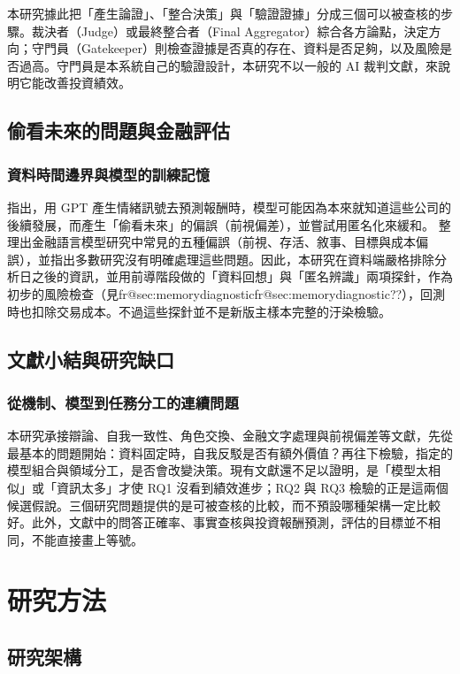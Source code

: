 \documentclass[12pt,a4paper]{article}
\makeatletter
\numberwithin{table}{section}
\numberwithin{figure}{section}
\newcommand{\frref}[1]{\ifcsname fr@#1\endcsname\csname fr@#1\endcsname\else ??\fi}
\makeatother
\begin{document}
本研究據此把「產生論證」、「整合決策」與「驗證證據」分成三個可以被查核的步驟。裁決者（Judge）或最終整合者（Final Aggregator）綜合各方論點，決定方向；守門員（Gatekeeper）則檢查證據是否真的存在、資料是否足夠，以及風險是否過高。守門員是本系統自己的驗證設計，本研究不以一般的 AI 裁判文獻，來說明它能改善投資績效。

\subsection{偷看未來的問題與金融評估}

\subsubsection{資料時間邊界與模型的訓練記憶}
\citet{glasserman2023lookahead} 指出，用 GPT 產生情緒訊號去預測報酬時，模型可能因為本來就知道這些公司的後續發展，而產生「偷看未來」的偏誤（前視偏差），並嘗試用匿名化來緩和。\citet{kong2026bias} 整理出金融語言模型研究中常見的五種偏誤（前視、存活、敘事、目標與成本偏誤），並指出多數研究沒有明確處理這些問題。因此，本研究在資料端嚴格排除分析日之後的資訊，並用前導階段做的「資料回想」與「匿名辨識」兩項探針，作為初步的風險檢查（見\frref{sec:memorydiagnostic}），回測時也扣除交易成本。不過這些探針並不是新版主樣本完整的汙染檢驗。
\subsection{文獻小結與研究缺口}

\subsubsection{從機制、模型到任務分工的連續問題}

本研究承接辯論、自我一致性、角色交換、金融文字處理與前視偏差等文獻，先從最基本的問題開始：資料固定時，自我反駁是否有額外價值？再往下檢驗，指定的模型組合與領域分工，是否會改變決策。現有文獻還不足以證明，是「模型太相似」或「資訊太多」才使 RQ1 沒看到績效進步；RQ2 與 RQ3 檢驗的正是這兩個候選假說。三個研究問題提供的是可被查核的比較，而不預設哪種架構一定比較好。此外，文獻中的問答正確率、事實查核與投資報酬預測，評估的目標並不相同，不能直接畫上等號。

\clearpage\section{研究方法}

\subsection{研究架構}
\end{document}
